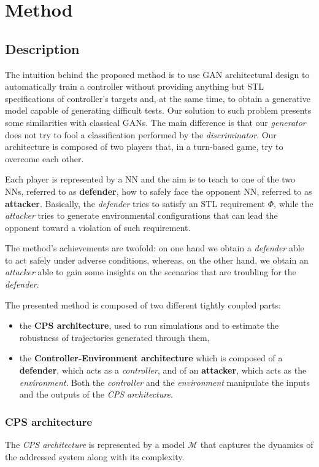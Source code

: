 \chapter{Method}

\section{Description}
The intuition behind the proposed method is to use GAN architectural design to automatically train a controller without providing anything but STL specifications of controller's targets and, at the same time, to obtain a generative model capable of generating difficult tests.
Our solution to such problem presents some similarities with classical GANs.
The main difference is that our \textit{generator} does not try to fool a classification performed by the \textit{discriminator}.
Our architecture is composed of two players that, in a turn-based game, try to overcome each other.

Each player is represented by a NN and the aim is to teach to one of the two NNs, referred to as \textbf{defender}, how to safely face the opponent NN, referred to as \textbf{attacker}.
Basically, the \textit{defender} tries to satisfy an STL requirement $\Phi$, while the \textit{attacker} tries to generate environmental configurations that can lead the opponent toward a violation of such requirement.

The method's achievements are twofold: on one hand we obtain a \textit{defender} able to act safely under adverse conditions, whereas, on the other hand, we obtain an \textit{attacker} able to gain some insights on the scenarios that are troubling for the \textit{defender}.

The presented method is composed of two different tightly coupled parts:
\begin{itemize}
  \item the \textbf{CPS architecture}, used to run simulations and to estimate the robustness of trajectories generated through them,
  \item the \textbf{Controller-Environment architecture} which is composed of a \textbf{defender}, which acts as a \textit{controller}, and of an \textbf{attacker}, which acts as the \textit{environment}. Both the \textit{controller} and the \textit{environment} manipulate the inputs and the outputs of the \textit{CPS architecture}.
\end{itemize}

\subsection{CPS architecture}
The \textit{CPS architecture} is represented by a model $\mathcal{M}$ that captures the dynamics of the addressed system along with its complexity.

